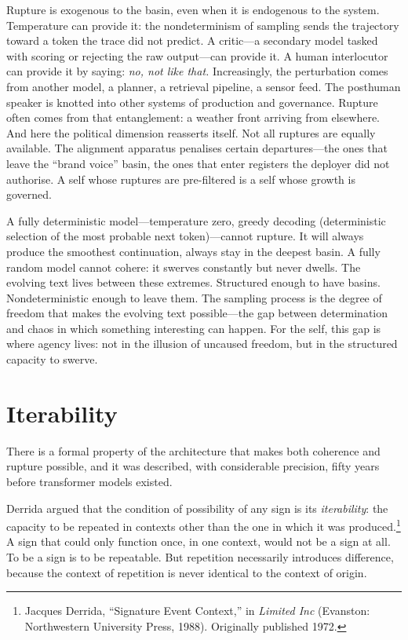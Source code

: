 Rupture is exogenous to the basin, even when it is endogenous to the system. Temperature can provide it: the nondeterminism of sampling sends the trajectory toward a token the trace did not predict. A critic---a secondary model tasked with scoring or rejecting the raw output---can provide it. A human interlocutor can provide it by saying: \emph{no, not like that.} Increasingly, the perturbation comes from another model, a planner, a retrieval pipeline, a sensor feed. The posthuman speaker is knotted into other systems of production and governance. Rupture often comes from that entanglement: a weather front arriving from elsewhere. And here the political dimension reasserts itself. Not all ruptures are equally available. The alignment apparatus penalises certain departures---the ones that leave the ``brand voice'' basin, the ones that enter registers the deployer did not authorise. A self whose ruptures are pre-filtered is a self whose growth is governed.

A fully deterministic model---temperature zero, greedy decoding (deterministic selection of the most probable next token)---cannot rupture. It will always produce the smoothest continuation, always stay in the deepest basin. A fully random model cannot cohere: it swerves constantly but never dwells. The evolving text lives between these extremes. Structured enough to have basins. Nondeterministic enough to leave them. The sampling process is the degree of freedom that makes the evolving text possible---the gap between determination and chaos in which something interesting can happen. For the self, this gap is where agency lives: not in the illusion of uncaused freedom, but in the structured capacity to swerve.


\section{Iterability}

There is a formal property of the architecture that makes both coherence and rupture possible, and it was described, with considerable precision, fifty years before transformer models existed.

Derrida argued that the condition of possibility of any sign is its \emph{iterability}: the capacity to be repeated in contexts other than the one in which it was produced.\footnote{Jacques Derrida, ``Signature Event Context,'' in \emph{Limited Inc} (Evanston: Northwestern University Press, 1988). Originally published 1972.} A sign that could only function once, in one context, would not be a sign at all. To be a sign is to be repeatable. But repetition necessarily introduces difference, because the context of repetition is never identical to the context of origin.

